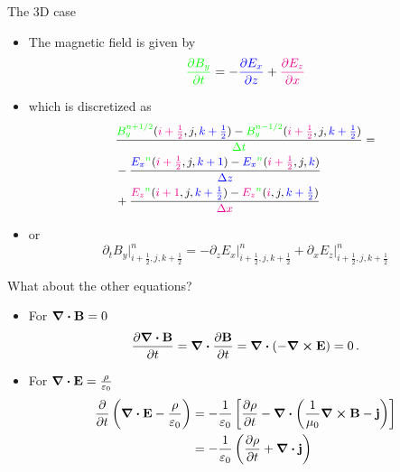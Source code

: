 \documentclass{beamer}
\makeatletter
\def\mathcolor#1#{\@mathcolor{#1}}
\def\@mathcolor#1#2#3{%
  \protect\leavevmode
  \begingroup
    \color#1{#2}#3%
  \endgroup
}
\makeatother
\begin{document}
\begin{frame}{The 3D case}
	\begin{itemize}
		\item The magnetic field is given by
		\[
		\mathcolor{green}{\pdv{B_y}{t}} = -\mathcolor{blue}{\pdv{E_x}{z}} + \mathcolor{magenta}{\pdv{E_z}{x}}
		\]
		\item which is discretized as
		\begin{equation*}
		\small
		  \begin{aligned}
		    &\frac{\mathcolor{green}{B_y^{n+1/2}}(\mathcolor{magenta}{i+\frac{1}{2}},j,\mathcolor{blue}{k+\frac{1}{2}})
		    - \mathcolor{green}{B_y^{n-1/2}}(\mathcolor{magenta}{i+\frac{1}{2}},j,\mathcolor{blue}{k+\frac{1}{2}})}{\mathcolor{green}{\Delta t}} = \\
		    &- \frac{\mathcolor{blue}{E_x}^{\mathcolor{green}{n}}(\mathcolor{magenta}{i+\frac{1}{2}},j,\mathcolor{blue}{k+1}) -
		      \mathcolor{blue}{E_x}^{\mathcolor{green}{n}}(\mathcolor{magenta}{i+\frac{1}{2}},j,\mathcolor{blue}{k})}{\mathcolor{blue}{\Delta z}}
		    \\&+ \frac{\mathcolor{magenta}{E_z}^{\mathcolor{green}{n}}(\mathcolor{magenta}{i+1},j,\mathcolor{blue}{k+\frac{1}{2}}) -
		      \mathcolor{magenta}{E_z}^{\mathcolor{green}{n}}(\mathcolor{magenta}{i},j,\mathcolor{blue}{k+\frac{1}{2}})}{\mathcolor{magenta}{\Delta x}}
		  \end{aligned}
		\end{equation*}
		\item or
		\[
		\partial_t B_y \rvert^n_{i+\frac{1}{2},j,k+\frac{1}{2}} =
		  -\partial_z E_x \rvert^n_{i+\frac{1}{2},j,k+\frac{1}{2}}
		  +\partial_x E_z \rvert^n_{i+\frac{1}{2},j,k+\frac{1}{2}}
		\]
	\end{itemize}
\end{frame}

\begin{frame}{What about the other equations?}
	\begin{itemize}
		\item For \(\div{\vb{B}} = 0 \)
		\[
		\pdv{\div{\vb{B}}}{t} = \div{\pdv{\vb{B}}{t}} = \div{\left(-\curl{\vb{E}}\right)} = 0\,.
		\]
		\item For \(\div{\vb{E}} = \frac{\rho}{\varepsilon_0}\)
		\[
		\begin{aligned}
			\pdv{t} \left(\div{\vb{E}} - \frac{\rho}{\varepsilon_0}\right) &=
			-\frac{1}{\varepsilon_0} \left[\pdv{\rho}{t}
			-\div{\left(\frac{1}{\mu_0} \curl{\vb{B}} - \vb{j}\right)}\right]\\ &=
			-\frac{1}{\varepsilon_0} \left(\pdv{\rho}{t} + \div{\vb{j}}\right)
		\end{aligned}
		\]
	\end{itemize}
\end{frame}
\end{document}
